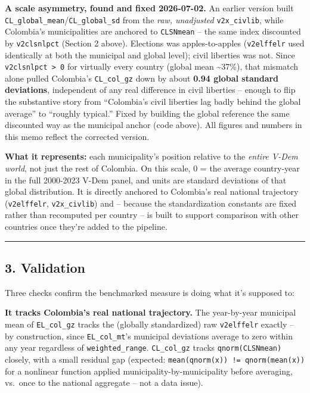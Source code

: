 \documentclass[
]{article}
\begin{document}
\textbf{A scale asymmetry, found and fixed 2026-07-02.} An earlier
version built \texttt{CL\_global\_mean}/\texttt{CL\_global\_sd} from the
\emph{raw, unadjusted} \texttt{v2x\_civlib}, while Colombia's
municipalities are anchored to \texttt{CLSNmean} -- the same index
discounted by \texttt{v2clsnlpct} (Section 2 above). Elections was
apples-to-apples (\texttt{v2elffelr} used identically at both the
municipal and global level); civil liberties was not. Since
\texttt{v2clsnlpct\ \textgreater{}\ 0} for virtually every country
(global mean \textasciitilde37\%), that mismatch alone pulled Colombia's
\texttt{CL\_col\_gz} down by about \textbf{0.94 global standard
deviations}, independent of any real difference in civil liberties --
enough to flip the substantive story from ``Colombia's civil liberties
lag badly behind the global average'' to ``roughly typical.'' Fixed by
building the global reference the same discounted way as the municipal
anchor (code above). All figures and numbers in this memo reflect the
corrected version.

\textbf{What it represents:} each municipality's position relative to
the \emph{entire V-Dem world}, not just the rest of Colombia. On this
scale, 0 = the average country-year in the full 2000-2023 V-Dem panel,
and units are standard deviations of that global distribution. It is
directly anchored to Colombia's real national trajectory
(\texttt{v2elffelr}, \texttt{v2x\_civlib}) and -- because the
standardization constants are fixed rather than recomputed per country
-- is built to support comparison with other countries once they're
added to the pipeline.

\begin{center}\rule{0.5\linewidth}{0.5pt}\end{center}

\hypertarget{validation}{%
\subsection{3. Validation}\label{validation}}

Three checks confirm the benchmarked measure is doing what it's supposed
to:

\textbf{It tracks Colombia's real national trajectory.} The year-by-year
municipal mean of \texttt{EL\_col\_gz} tracks the (globally
standardized) raw \texttt{v2elffelr} exactly -- by construction, since
\texttt{EL\_col\_mt}'s municipal deviations average to zero within any
year regardless of \texttt{weighted\_range}. \texttt{CL\_col\_gz} tracks
\texttt{qnorm(CLSNmean)} closely, with a small residual gap (expected:
\texttt{mean(qnorm(x))\ !=\ qnorm(mean(x))} for a nonlinear function
applied municipality-by-municipality before averaging, vs.~once to the
national aggregate -- not a data issue).
\end{document}

